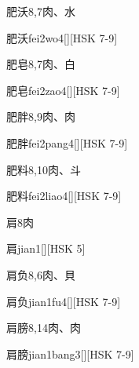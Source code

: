 \begin{Entry}{肥沃}{8,7}{⾁、⽔}
  \begin{Phonetics}{肥沃}{fei2wo4}[][HSK 7-9]
  \end{Phonetics}
\end{Entry}

\begin{Entry}{肥皂}{8,7}{⾁、⽩}
  \begin{Phonetics}{肥皂}{fei2zao4}[][HSK 7-9]
  \end{Phonetics}
\end{Entry}

\begin{Entry}{肥胖}{8,9}{⾁、⾁}
  \begin{Phonetics}{肥胖}{fei2pang4}[][HSK 7-9]
  \end{Phonetics}
\end{Entry}

\begin{Entry}{肥料}{8,10}{⾁、⽃}
  \begin{Phonetics}{肥料}{fei2liao4}[][HSK 7-9]
  \end{Phonetics}
\end{Entry}

\begin{Entry}{肩}{8}{⾁}
  \begin{Phonetics}{肩}{jian1}[][HSK 5]
  \end{Phonetics}
\end{Entry}

\begin{Entry}{肩负}{8,6}{⾁、⾙}
  \begin{Phonetics}{肩负}{jian1fu4}[][HSK 7-9]
  \end{Phonetics}
\end{Entry}

\begin{Entry}{肩膀}{8,14}{⾁、⾁}
  \begin{Phonetics}{肩膀}{jian1bang3}[][HSK 7-9]
  \end{Phonetics}
\end{Entry}

